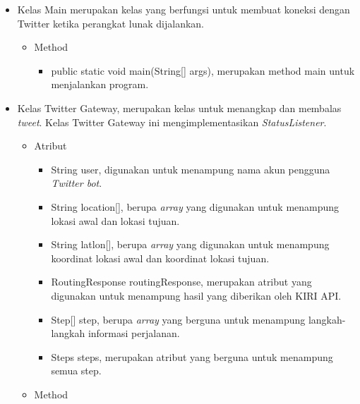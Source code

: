 \begin{itemize}
		\item Kelas Main merupakan kelas yang berfungsi untuk membuat koneksi dengan Twitter ketika perangkat lunak dijalankan.
		
				\begin{itemize}
							\item Method
							
									\begin{itemize}
												\item public static void main(String[] args), merupakan method main untuk menjalankan program.
										
									\end{itemize}
				\end{itemize}
		
		\item Kelas Twitter Gateway, merupakan kelas untuk menangkap dan membalas \textit{tweet}. Kelas Twitter Gateway ini mengimplementasikan \textit{StatusListener}.
		
		
				\begin{itemize}
							\item Atribut
							
							
									\begin{itemize}
												\item String user, digunakan untuk menampung nama akun pengguna \textit{Twitter bot}.
												\item String location[], berupa \textit{array} yang digunakan untuk menampung lokasi awal dan lokasi tujuan.
												\item String latlon[], berupa \textit{array} yang digunakan untuk menampung koordinat lokasi awal dan koordinat lokasi tujuan.
												\item RoutingResponse routingResponse, merupakan atribut yang digunakan untuk menampung hasil yang diberikan oleh KIRI API.
												\item Step[] step, berupa \textit{array} yang berguna untuk menampung langkah-langkah informasi perjalanan.
												\item Steps steps, merupakan atribut yang berguna untuk menampung semua step.
									\end{itemize}
							
							\item Method
							

\end{itemize}
\end{itemize}
